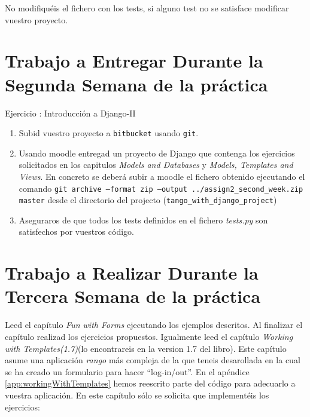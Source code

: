 \documentclass[12pt]{article} %
\newcounter{ejercicioNo}
\begin{document}
No modifiquéis el fichero con los tests, si alguno test no se satisface modificar vuestro proyecto. 


\section{Trabajo a Entregar Durante la Segunda Semana de la práctica}

\begin{minipage}{\linewidth}
\begin{framed}
\addtocounter{ejercicioNo}{1} 
Ejercicio : Introducción a Django-II
\begin{enumerate}
\item Subid vuestro proyecto a \texttt{bitbucket} usando \texttt{git}. 

\item Usando moodle entregad un proyecto de Django que contenga los ejercicios solicitados en los capitulos \textit{Models and Databases} y  \textit{Models, Templates and Views}. En concreto se deberá subir a moodle el fichero obtenido ejecutando el comando \texttt{git archive --format zip --output ../assign2\_second\_week.zip  master} desde el directorio del projecto (\texttt{tango\_with\_django\_project})

\item Aseguraros de que todos los tests definidos en el fichero \textit{tests.py} son satisfechos por vuestros código.
\end{enumerate}
\end{framed}
\end{minipage}

\section{Trabajo a Realizar Durante la Tercera Semana de la práctica}

Leed el capítulo \textit{Fun with Forms}  ejecutando los ejemplos descritos.
Al finalizar el capítulo  realizad los ejercicios propuestos. Igualmente leed el capítulo
\textit{Working with Templates(1.7)}(lo encontrareis en la version 1.7 del libro). Este capítulo  
asume una aplicación \textit{rango} más compleja de la que teneis desarollada en la cual se ha creado un formulario para hacer ``log-in/out''. En el apéndice \ref{app:workingWithTemplates}
hemos reescrito parte del código para adecuarlo a vuestra aplicación. En este capítulo sólo se solicita que implementéis los ejercicios:
\end{document}
